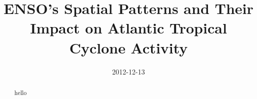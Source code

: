 \documentclass[]{article}
\title{ENSO's Spatial Patterns and Their Impact on Atlantic Tropical Cyclone Activity}
\date{2012-12-13}
\begin{document}
\maketitle
\begin{abstract}
	hello
\end{abstract}



%


%
%
%

\end{document}
